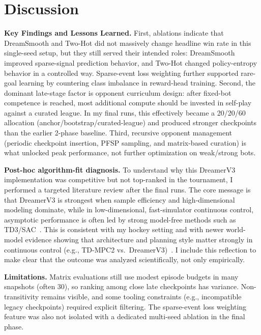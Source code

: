 \documentclass[11pt]{article}
\begin{document}
\section{Discussion}\label{sec:discussion}

\textbf{Key Findings and Lessons Learned.} First, ablations indicate that DreamSmooth and Two-Hot did not massively change headline win rate in this single-seed setup, but they still served their intended roles: DreamSmooth improved sparse-signal prediction behavior, and Two-Hot changed policy-entropy behavior in a controlled way. Sparse-event loss weighting further supported rare-goal learning by countering class imbalance in reward-head training. Second, the dominant late-stage factor is opponent curriculum design: after fixed-bot competence is reached, most additional compute should be invested in self-play against a curated league. In my final runs, this effectively became a 20/20/60 allocation (anchor/bootstrap/curated-league) and produced stronger checkpoints than the earlier 2-phase baseline. Third, recursive opponent management (periodic checkpoint insertion, PFSP sampling, and matrix-based curation) is what unlocked peak performance, not further optimization on weak/strong bots.

\textbf{Post-hoc algorithm-fit diagnosis.} To understand why this DreamerV3 implementation was competitive but not top-ranked in the tournament, I performed a targeted literature review after the final runs. The core message is that DreamerV3 is strongest when sample efficiency and high-dimensional modeling dominate, while in low-dimensional, fast-simulator continuous control, asymptotic performance is often led by strong model-free methods such as TD3/SAC~\cite{hafner2024,fujimoto2018,haarnoja2018}. This is consistent with my hockey setting and with newer world-model evidence showing that architecture and planning style matter strongly in continuous control (e.g., TD-MPC2 vs.\ DreamerV3)~\cite{hansen2024}. I include this reflection to make clear that the outcome was analyzed scientifically, not only empirically.

\textbf{Limitations.} Matrix evaluations still use modest episode budgets in many snapshots (often 30), so ranking among close late checkpoints has variance. Non-transitivity remains visible, and some tooling constraints (e.g., incompatible legacy checkpoints) required explicit filtering. The sparse-event loss weighting feature was also not isolated with a dedicated multi-seed ablation in the final phase.
\end{document}

